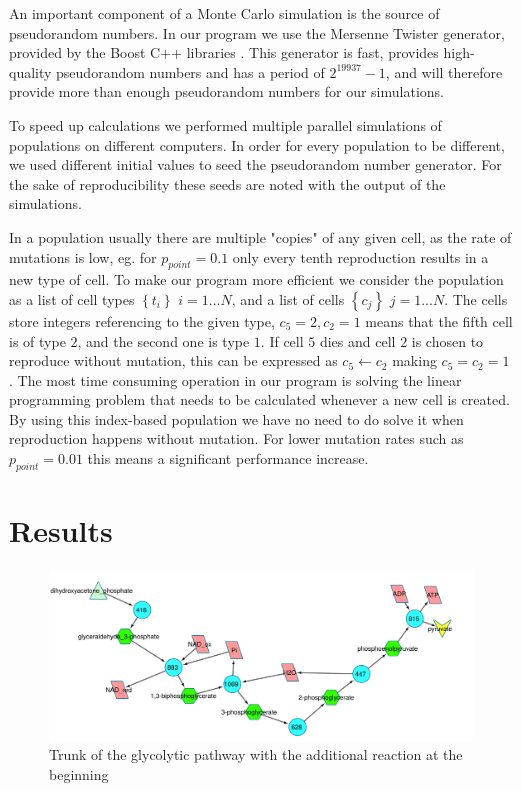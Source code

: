 \documentclass[a4paper,12pt]{article}
\begin{document}
	An important component of a Monte Carlo simulation is the source of pseudorandom numbers. In our program we use the Mersenne Twister \cite{mersennetwister} generator, provided by the Boost C++ libraries \cite{boostlibraries}. This generator is fast, provides high-quality pseudorandom numbers and has a period of $2^{19937}-1$, and will therefore provide more than enough pseudorandom numbers for our simulations.

	To speed up calculations we performed multiple parallel simulations of populations on different computers. In order for every population to be different, we used different initial values to seed the pseudorandom number generator. For the sake of reproducibility these seeds are noted with the output of the simulations. 

In a population usually there are multiple "copies" of any given cell, as the rate of mutations is low, eg. for $p_{point}=0.1$ only every tenth reproduction results in a new type of cell. To make our program more efficient we consider the population as a list of cell types $ \left\{ t_i \right\}$ $i=1...N$, and a list of cells $\left\{ c_j \right\}$ $j=1...N$. The cells store integers referencing to the given type, $c_5=2, c_2=1$ means that the fifth cell is of type $2$, and the second one is type $1$. If cell $5$ dies and cell $2$ is chosen to reproduce without mutation, this can be expressed as $c_5 \leftarrow c_2$ making $c_5=c_2=1$. The most time consuming operation in our program is solving the linear programming problem that needs to be calculated whenever a new cell is created. By using this index-based population we have no need to do solve it when reproduction happens without mutation. For lower mutation rates such as $p_{point}=0.01$ this means a significant performance increase. 

\section{Results}
\label{sec:results}

\begin{figure}[htpb]
	\centering
	\includegraphics[width=1\linewidth]{trunk_glyc_init_large.pdf}
	\caption{Trunk of the glycolytic pathway with the additional reaction at the beginning}
	\label{fig:truncglycinit}
\end{figure}
\end{document}
